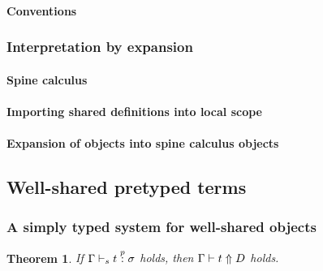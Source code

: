 \documentclass[9pt,authoryear]{sigplanconf}
\newtheorem{theorem}{Theorem}
\begin{document}
\paragraph{Conventions} 




\subsubsection{Interpretation by expansion}

\paragraph{Spine calculus}


\paragraph{Importing shared definitions into local scope}


\paragraph{Expansion of {\system} objects into spine calculus objects}



\subsection{Well-shared pretyped terms}

\subsubsection{A simply typed system for well-shared objects}








\begin{theorem}
If $\Gamma \vdash_{s} t \stackrel{p}{:} \sigma$ holds, then 
$\Gamma \vdash t \Uparrow D$ holds. 
\end{theorem}
\end{document}
